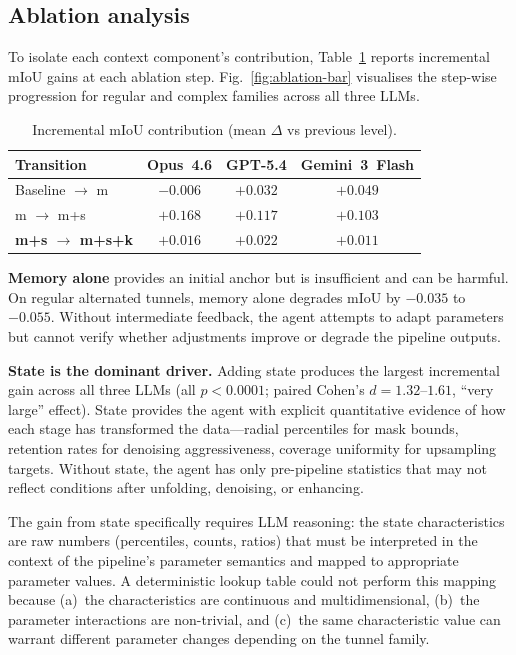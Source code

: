 \documentclass[a4paper,fleqn]{cas-dc}
\begin{document}
\subsection{Ablation analysis}\label{sec:ablation}

To isolate each context component's contribution, Table~\ref{tab:incremental_miou} reports incremental mIoU gains at each ablation step. Fig.~\ref{fig:ablation-bar} visualises the step-wise progression for regular and complex families across all three LLMs.

\begin{table}[ht]
\caption{Incremental mIoU contribution (mean $\Delta$ vs previous level).}\label{tab:incremental_miou}
\begin{tabular*}{\tblwidth}{@{} l c c c @{}}
\toprule
Transition & Opus~4.6 & GPT-5.4 & Gemini~3~Flash \\
\midrule
Baseline $\rightarrow$ m & $-0.006$ & $+0.032$ & $+0.049$ \\
m $\rightarrow$ m+s & $+0.168$ & $+0.117$ & $+0.103$ \\
\textbf{m+s $\rightarrow$ m+s+k} & $\mathbf{+0.016}$ & $\mathbf{+0.022}$ & $\mathbf{+0.011}$ \\
\bottomrule
\end{tabular*}
\end{table}

\textbf{Memory alone} provides an initial anchor but is insufficient and can be harmful. On regular alternated tunnels, memory alone degrades mIoU by $-0.035$ to $-0.055$. Without intermediate feedback, the agent attempts to adapt parameters but cannot verify whether adjustments improve or degrade the pipeline outputs.

\textbf{State is the dominant driver.} Adding state produces the largest incremental gain across all three LLMs (all $p < 0.0001$; paired Cohen's $d = 1.32$--$1.61$, ``very large'' effect). State provides the agent with explicit quantitative evidence of how each stage has transformed the data---radial percentiles for mask bounds, retention rates for denoising aggressiveness, coverage uniformity for upsampling targets. Without state, the agent has only pre-pipeline statistics that may not reflect conditions after unfolding, denoising, or enhancing.

The gain from state specifically requires LLM reasoning: the state characteristics are raw numbers (percentiles, counts, ratios) that must be interpreted in the context of the pipeline's parameter semantics and mapped to appropriate parameter values. A deterministic lookup table could not perform this mapping because (a)~the characteristics are continuous and multidimensional, (b)~the parameter interactions are non-trivial, and (c)~the same characteristic value can warrant different parameter changes depending on the tunnel family.
\end{document}
